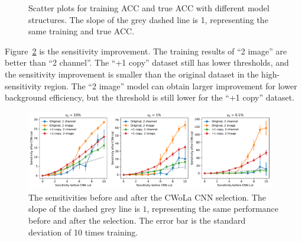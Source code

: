 \documentclass[12pt]{article}
\begin{document}
			\begin{figure}[htpb]
				\centering
				\caption{Scatter plots for training ACC and true ACC with different model structures. The slope of the grey dashed line is 1, representing the same training and true ACC.}
				\label{fig:acc_scatter_ZN_model}
			\end{figure}

			Figure~\ref{fig:sensitivity_improvement_bkg_eff_ZN_model} is the sensitivity improvement. The training results of ``2 image'' are better than ``2 channel''. The ``+1 copy'' dataset still has lower thresholds, and the sensitivity improvement is smaller than the original dataset in the high-sensitivity region. The ``2 image'' model can obtain larger improvement for lower background efficiency, but the threshold is still lower for the ``+1 copy'' dataset.
			\begin{figure}[htpb]
				\centering
				\includegraphics[width=0.97\textwidth]{HVmodel_sensitivity_improvement_bkg_eff_origin_copy_1_ZN_model.pdf}
				\caption{The sensitivities before and after the CWoLa CNN selection. The slope of the dashed grey line is $1$, representing the same performance before and after the selection. The error bar is the standard deviation of 10 times training.}
				\label{fig:sensitivity_improvement_bkg_eff_ZN_model}
			\end{figure}
\end{document}
